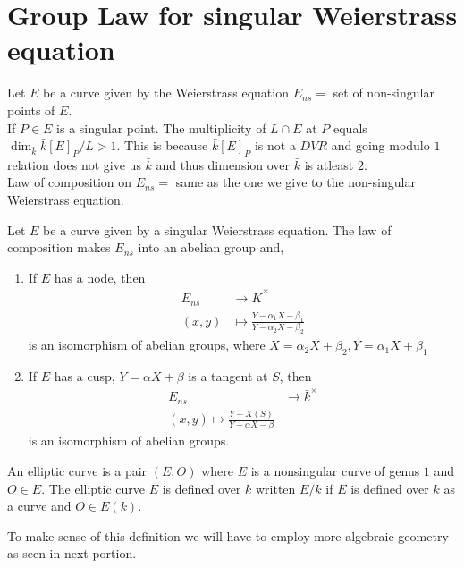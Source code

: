 \documentclass[oneside, 12pt]{scrbook}
\theoremstyle{theorem}
\begin{document}
\section{Group Law for singular Weierstrass equation}

Let $E$ be a curve given by the Weierstrass equation $E_{ns}=$ set of non-singular points of $E$. \\

If $P\in E$ is a singular point. The multiplicity of $L \cap E$ at $P$ equals $\dim_{\bar{k}} \bar{k}[E]_{P}/L >1$. This is because $\bar{k}[E]_{P}$ is not a $DVR$ and going modulo $1$ relation does not give us $\bar{k}$ and thus dimension over $\bar{k}$ is atleast $2$.\\

Law of composition on $E_{ns} =$ same as the one we give to the non-singular Weierstrass equation.

\begin{proposition}
Let $E$ be a curve given by a singular Weierstrass equation. The law of composition makes $E_{ns}$ into an abelian group and, 
\begin{enumerate}
\item If $E$ has a node, then 
\begin{align*}
E_{ns} &\rightarrow \bar{K}^{\times} \\
(x,y) &\mapsto \frac{Y-\alpha_{1} X - \beta_{1}}{Y- \alpha_{2}X - \beta_{2}}
\end{align*} 
is an isomorphism of abelian groups, 
where $X = \alpha_{2} X + \beta_{2} , Y = \alpha_{1}X + \beta_{1}$

\item If $E$ has a cusp, $Y = \alpha X + \beta$ is a tangent at $S$, then 
\begin{align*}
E_{ns} &\rightarrow \bar{k}^{\times} \\
(x,y) \mapsto \frac{Y- X(S)}{Y - \alpha X - \beta}
\end{align*}
is an isomorphism of abelian groups.
\end{enumerate}
\end{proposition} 

\begin{definition}
An elliptic curve is a pair $(E,O)$ where $E$ is a nonsingular curve of genus $1$ and $O \in E$. The elliptic curve $E$ is defined over $k$ written $E/k$ if $E$ is defined over $k$ as a curve and $O \in E(k)$.
\end{definition}

To make sense of this definition we will have to employ more algebraic geometry as seen in next portion.
\end{document}
